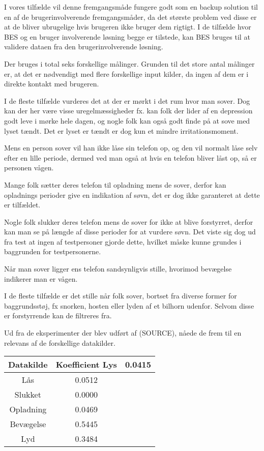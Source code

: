I vores tilfælde vil denne fremgangsmåde fungere godt som en backup solution til en af de brugerinvolverende fremgangsmåder, da det største problem ved disse er at de bliver ubrugelige hvis brugeren ikke bruger dem rigtigt.
I de tilfælde hvor BES og en bruger involverende løsning begge er tilstede, kan BES bruges til at validere dataen fra den brugerinvolverende løsning. 

Der bruges i total seks forskellige målinger.
Grunden til det store antal målinger er, at det er nødvendigt med flere forskellige input kilder, da ingen af dem er i direkte kontakt med brugeren.
\begin{description}[style=nextline]
\item[Lys]
I de fleste tilfælde vurderes det at der er mørkt i det rum hvor man sover. Dog kan der her være visse uregelmæssigheder fx. kan folk der lider af en depression godt leve i mørke hele dagen, og nogle folk kan også godt finde på at sove med lyset tændt. Det er lyset er tændt er dog kun et mindre irritationsmoment.
\item[Lås]
Mens en person sover vil han ikke låse sin telefon op, og den vil normalt låse selv efter en lille periode, dermed ved man også at hvis en telefon bliver låst op, så er personen vågen.
\item[Opladning]
Mange folk sætter deres telefon til opladning mens de sover, derfor kan opladnings perioder give en indikation af søvn, det er dog ikke garanteret at dette er tilfældet.
\item[Slukket]
Nogle folk slukker deres telefon mens de sover for ikke at blive forstyrret, derfor kan man se på længde af disse perioder for at vurdere søvn. Det viste sig dog ud fra test at ingen af testpersoner gjorde dette, hvilket måske kunne grundes i baggrunden for testpersonerne. 
\item[Bevægelse]
Når man sover ligger ens telefon sandsynligvis stille, hvorimod bevægelse indikerer man er vågen.
\item[Lyd]
I de fleste tilfælde er det stille når folk sover, bortset fra diverse former for baggrundsstøj, fx snorken, hosten eller  lyden af et bilhorn udenfor. Selvom disse er forstyrrende kan de filtreres fra.
\end{description}

Ud fra de eksperimenter der blev udført af (SOURCE), nåede de frem til en relevans af de forskellige datakilder.

\begin{tabular}{|c|c|}
\hline Datakilde & Koefficient
\hline Lys & 0.0415 \\ 
\hline Lås & 0.0512 \\ 
\hline Slukket & 0.0000 \\ 
\hline Opladning & 0.0469 \\ 
\hline Bevægelse & 0.5445 \\ 
\hline Lyd & 0.3484 \\ 
\hline 
\end{tabular} 

